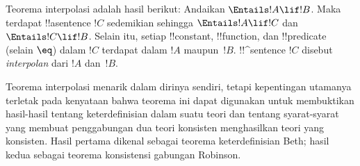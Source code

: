 \documentclass[../../../include/open-logic-section]{subfiles}
\begin{document}


Teorema interpolasi adalah hasil berikut: Andaikan
$\Entails !A \lif !B$. Maka terdapat !!a{sentence} $!C$ sedemikian sehingga
$\Entails !A \lif !C$ dan $\Entails !C \lif !B$. Selain itu, setiap
!!{constant}, !!{function}, dan !!{predicate} (selain $\eq$) dalam
$!C$ terdapat dalam $!A$ maupun~$!B$. !!^{sentence} $!C$ disebut
\emph{interpolan} dari $!A$ dan~$!B$.

Teorema interpolasi menarik dalam dirinya sendiri, tetapi kepentingan
utamanya terletak pada kenyataan bahwa teorema ini dapat digunakan untuk
membuktikan hasil-hasil tentang keterdefinisian dalam suatu teori dan tentang
syarat-syarat yang membuat penggabungan dua teori konsisten menghasilkan teori
yang konsisten. Hasil pertama dikenal sebagai teorema keterdefinisian Beth;
hasil kedua sebagai teorema konsistensi gabungan Robinson.
\end{document}
